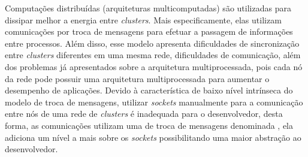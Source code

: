 %
%
%
%
%
%



Computações distribuídas (arquiteturas multicomputadas) são utilizadas para
dissipar melhor a energia entre \textit{clusters}. Mais especificamente, elas
utilizam comunicações por troca de mensagens para efetuar a passagem de
informações entre processos. Além disso, esse modelo apresenta dificuldades de
sincronização entre \textit{clusters} diferentes em uma mesma rede, dificuldades
de comunicação, além dos problemas já apresentados sobre a arquitetura
multiprocessada, pois cada nó da rede pode possuir uma arquitetura
multiprocessada para aumentar o desempenho de aplicações.
Devido à característica de baixo nível intrínseca do modelo de troca de
mensagens, utilizar \textit{sockets} manualmente para a comunicação entre nós de
uma rede de \textit{clusters} é inadequada para o desenvolvedor, desta forma, as
comunicações utilizam uma \api de troca de mensagens denominada \MPI, ela
adiciona um nível a mais sobre os \textit{sockets} possibilitando uma maior
abstração ao desenvolvedor.



